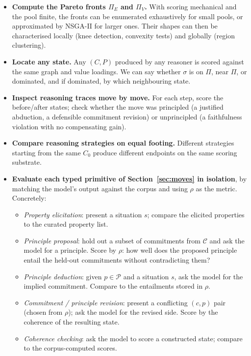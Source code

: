 \documentclass{article}
\begin{document}
\begin{itemize}[leftmargin=*, itemsep=2pt]
  \item \textbf{Compute the Pareto fronts $\Pi_E$ and $\Pi_V$.} With
    scoring mechanical and the pool finite, the fronts can be enumerated
    exhaustively for small pools, or approximated by NSGA-II for larger
    ones. Their shapes can then be characterised locally (knee detection,
    convexity tests) and globally (region clustering).
  \item \textbf{Locate any state.} Any $(C, P)$ produced by any reasoner
    is scored against the same graph and value loadings. We can say
    whether $\sigma$ is on $\Pi$, near $\Pi$, or dominated, and if
    dominated, by which neighbouring state.
  \item \textbf{Inspect reasoning traces move by move.} For each step,
    score the before/after states; check whether the move was principled
    (a justified abduction, a defensible commitment revision) or
    unprincipled (a faithfulness violation with no compensating gain).
  \item \textbf{Compare reasoning strategies on equal footing.} Different
    strategies starting from the same $C_0$ produce different endpoints
    on the same scoring substrate.
  \item \textbf{Evaluate each typed primitive of
    Section~\ref{sec:moves} in isolation}, by matching the model's output
    against the corpus and using $\rho$ as the metric. Concretely:
    \begin{itemize}[leftmargin=*, itemsep=1pt, label=$\circ$]
      \item \emph{Property elicitation}: present a situation $s$; compare
        the elicited properties to the curated property list.
      \item \emph{Principle proposal}: hold out a subset of commitments
        from $\mathcal{C}$ and ask the model for a principle. Score by
        $\rho$: how well does the proposed principle entail the held-out
        commitments without contradicting them?
      \item \emph{Principle deduction}: given $p \in \mathcal{P}$ and a
        situation $s$, ask the model for the implied commitment. Compare
        to the entailments stored in $\rho$.
      \item \emph{Commitment / principle revision}: present a conflicting
        $(c, p)$ pair (chosen from $\rho$); ask the model for the revised
        side. Score by the coherence of the resulting state.
      \item \emph{Coherence checking}: ask the model to score a
        constructed state; compare to the corpus-computed scores.
    \end{itemize}
\end{itemize}
\end{document}
